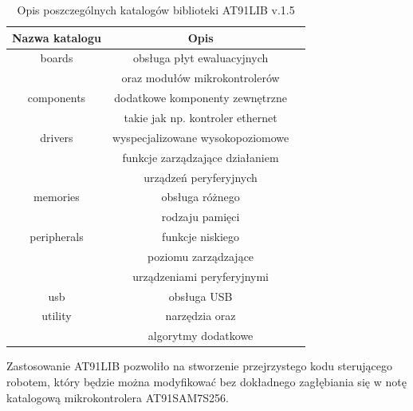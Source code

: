 \begin{table}[!ht]
\centering
\caption{Opis poszczególnych katalogów biblioteki AT91LIB v.1.5}
  \begin{tabular}{ | c | c | p{1.75cm} |} \hline
 Nazwa katalogu & Opis \\ \hline
   		boards & obsługa płyt ewaluacyjnych \\
& oraz modułów mikrokontrolerów \\ \hline
   		components & dodatkowe komponenty zewnętrzne \\
& takie jak np. kontroler ethernet \\ \hline
		drivers & wyspecjalizowane wysokopoziomowe \\ 
		 & funkcje zarządzające działaniem \\
& urządzeń peryferyjnych \\ \hline
		memories & obsługa różnego \\ 
& rodzaju pamięci \\ \hline
		peripherals & funkcje niskiego \\
		 & poziomu zarządzające \\ 
& urządzeniami peryferyjnymi \\ \hline usb & obsługa USB \\ \hline
		utility & narzędzia oraz \\ 
& algorytmy dodatkowe \\ \hline
   	\end{tabular}
\label{tab:AT91LIB}
\end{table}

Zastosowanie AT91LIB pozwoliło na stworzenie przejrzystego kodu sterującego
robotem, który będzie można modyfikować bez dokładnego zagłębiania się w notę
katalogową mikrokontrolera AT91SAM7S256.